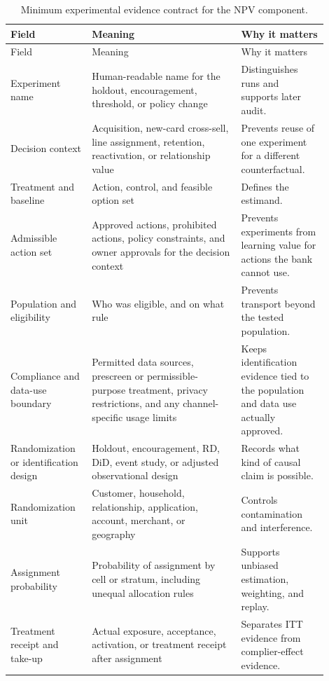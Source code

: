 \documentclass[11pt]{article}
\newcommand{\1}{\mathbf{1}}
\begin{document}
\begin{longtable}{L{0.22\linewidth}L{0.43\linewidth}L{0.25\linewidth}}
\caption{Minimum experimental evidence contract for the NPV component.}
\label{tab:experimental-contract}\\
\toprule
Field & Meaning & Why it matters \\
\midrule
\endfirsthead
\toprule
Field & Meaning & Why it matters \\
\midrule
\endhead
Experiment name
  & Human-readable name for the holdout, encouragement, threshold, or policy
    change
  & Distinguishes runs and supports later audit. \\
Decision context
  & Acquisition, new-card cross-sell, line assignment, retention, reactivation,
    or relationship value
  & Prevents reuse of one experiment for a different counterfactual. \\
Treatment and baseline
  & Action, control, and feasible option set
  & Defines the estimand. \\
Admissible action set
  & Approved actions, prohibited actions, policy constraints, and owner
    approvals for the decision context
  & Prevents experiments from learning value for actions the bank cannot use. \\
Population and eligibility
  & Who was eligible, and on what rule
  & Prevents transport beyond the tested population. \\
Compliance and data-use boundary
  & Permitted data sources, prescreen or permissible-purpose treatment,
    privacy restrictions, and any channel-specific usage limits
  & Keeps identification evidence tied to the population and data use actually
    approved. \\
Randomization or identification design
  & Holdout, encouragement, RD, DiD, event study, or adjusted observational
    design
  & Records what kind of causal claim is possible. \\
Randomization unit
  & Customer, household, relationship, application, account, merchant, or
    geography
  & Controls contamination and interference. \\
Assignment probability
  & Probability of assignment by cell or stratum, including unequal allocation
    rules
  & Supports unbiased estimation, weighting, and replay. \\
Treatment receipt and take-up
  & Actual exposure, acceptance, activation, or treatment receipt after
    assignment
  & Separates ITT evidence from complier-effect evidence. \\

\end{longtable}
\end{document}
